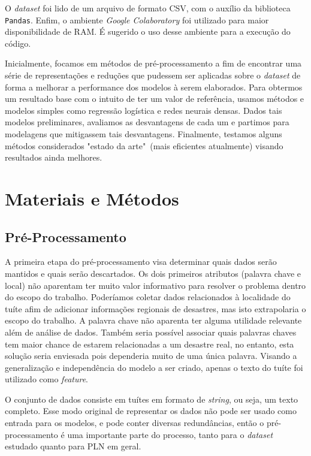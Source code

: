 \documentclass[twoside,conference,a4paper]{IEEEtran}
\begin{document}
O \textit{dataset} foi lido de um arquivo de formato CSV, com o auxílio da biblioteca \texttt{Pandas}. Enfim, o ambiente \textit{Google Colaboratory} foi utilizado para maior disponibilidade de RAM. É sugerido o uso desse ambiente para a execução do código.

Inicialmente, focamos em métodos de pré-processamento a fim de encontrar uma série de representações e reduções que pudessem ser aplicadas sobre o \textit{dataset} de forma a melhorar a performance dos modelos à serem elaborados. Para obtermos um resultado base com o intuito de ter um valor de referência, usamos métodos e modelos simples como regressão logística e redes neurais densas. Dados tais modelos preliminares, avaliamos as desvantagens de cada um e partimos para modelagens que mitigassem tais desvantagens. Finalmente, testamos alguns métodos considerados "estado da arte"~(mais eficientes atualmente) visando resultados ainda melhores.

\section{Materiais e Métodos} \label{methods}

\subsection{Pré-Processamento}

    A primeira etapa do pré-processamento visa determinar quais dados serão mantidos e quais serão descartados. Os dois primeiros atributos (palavra chave e local) não aparentam ter muito valor informativo para resolver o problema dentro do escopo do trabalho. Poderíamos coletar dados relacionados à localidade do tuíte afim de adicionar informações regionais de desastres, mas isto extrapolaria o escopo do trabalho. A palavra chave não aparenta ter alguma utilidade relevante além de análise de dados. Também seria possível associar quais palavras chaves tem maior chance de estarem relacionadas a um desastre real, no entanto, esta solução seria enviesada pois dependeria muito de uma única palavra. Visando a generalização e independência do modelo a ser criado, apenas o texto do tuíte foi utilizado como \textit{feature}.
    
    O conjunto de dados consiste em tuítes em formato de \textit{string}, ou seja, um texto completo. Esse modo original de representar os dados não pode ser usado como entrada para os modelos, e pode conter diversas redundâncias, então o pré-processamento é uma importante parte do processo, tanto para o \textit{dataset} estudado quanto para PLN em geral.
    
\end{document}
